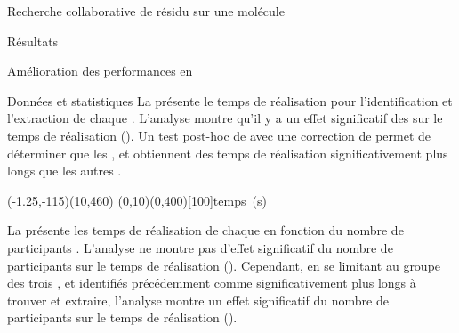 \documentclass[myfrancais]{mythesis}
\begin{document}
\begin{mychapter}{Recherche collaborative de résidu sur une molécule}
\begin{mysection}{Résultats}
\begin{mysubsection}{Amélioration des performances en }
\begin{mysubsubsection}{Données et statistiques}
					La  présente le temps de réalisation  pour l'identification et l'extraction de chaque  .
					L'analyse montre qu'il y a un effet significatif des   sur le temps de réalisation  ().
					Un test post-hoc de  avec une correction de  permet de déterminer que les  ,  et  obtiennent des temps de réalisation significativement plus longs que les autres .

					\begin{myfigure}
						\begin{myps}(-1.25,-115)(10,460)
							\myaxes(0,10){}(0,400)[100]{temps~(s)}
						\end{myps}
					\end{myfigure}

					La  présente les temps de réalisation  de chaque   en fonction du nombre de participants .
					L'analyse ne montre pas d'effet significatif du nombre de participants  sur le temps de réalisation  ().
					Cependant, en se limitant au groupe des trois  ,  et  identifiés précédemment comme significativement plus longs à trouver et extraire, l'analyse montre un effet significatif du nombre de participants  sur le temps de réalisation  ().


\end{mysubsubsection}
\end{mysubsection}
\end{mysection}
\end{mychapter}
\end{document}
